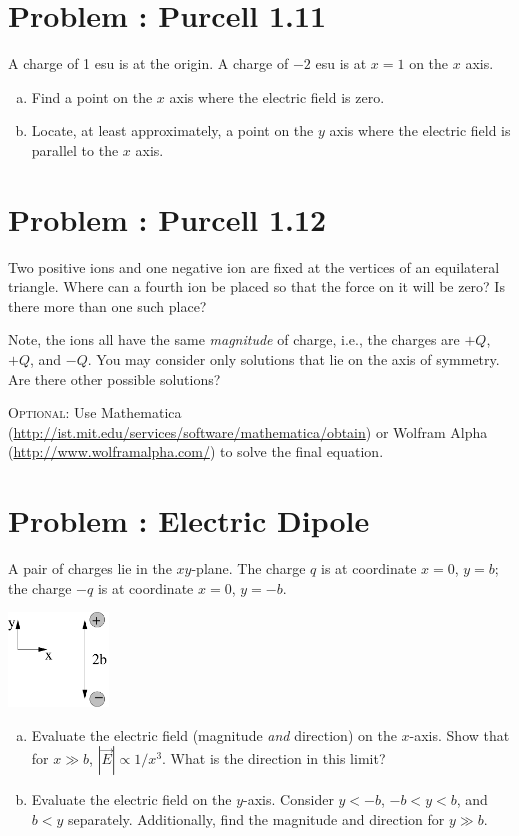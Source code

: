 \documentclass[problems]{esg8022pset}
\begin{document}
\section{Problem \thesection: Purcell 1.11}
  A charge of 1 esu is at the origin. A charge of $-2$ esu is at $x = 1$ on the $x$ axis.
  \begin{enumerate}[(a)]
    \item Find a point on the $x$ axis where the electric field is zero.
    \item Locate, at least approximately, a point on the $y$ axis where the electric field is parallel to the $x$ axis.
  \end{enumerate}
\section{Problem \thesection: Purcell 1.12}
  Two positive ions and one negative ion are fixed at the vertices of an equilateral triangle.  Where can a fourth ion be placed so that the force on it will be zero?  Is there more than one such place?

  Note, the ions all have the same \emph{magnitude} of charge, i.e., the charges are $+Q$, $+Q$, and $-Q$. You may consider only solutions that lie on the axis of symmetry. Are there other possible solutions?

  \textsc{Optional}: Use Mathematica (\url{http://ist.mit.edu/services/software/mathematica/obtain}) or Wolfram Alpha (\url{http://www.wolframalpha.com/}) to solve the final equation.
\section{Problem \thesection: Electric Dipole}
  A pair of charges lie in the $xy$-plane.  The charge $q$ is at coordinate $x = 0$, $y = b$; the charge $-q$ is at coordinate $x = 0$, $y = -b$.
  \begin{center}\includegraphics[width=0.2\textwidth]{ps01_8}\end{center}
  \begin{enumerate}[(a)]
    \item Evaluate the electric field (magnitude \emph{and} direction) on the $x$-axis.  Show that for $x \gg b$, $|\vec E| \propto 1 / x^3$.  What is the direction in this limit?
    \item Evaluate the electric field on the $y$-axis.  Consider $y < -b$, $-b < y < b$, and $b < y$ separately.  Additionally, find the magnitude and direction for $y \gg b$.
  \end{enumerate}
\end{document}
